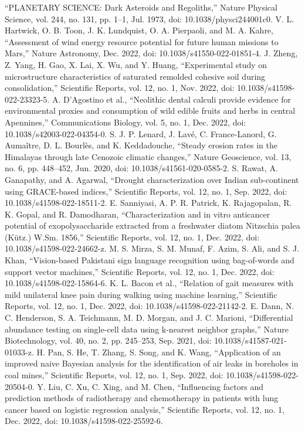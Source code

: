 \documentclass[conference]{IEEEtran}
\begin{document}
\begin{thebibliography}{00}
 “PLANETARY SCIENCE: Dark Asteroids and Regoliths,” Nature Physical Science, vol. 244, no. 131, pp. 1–1, Jul. 1973, doi: 10.1038/physci244001c0.
 V. L. Hartwick, O. B. Toon, J. K. Lundquist, O. A. Pierpaoli, and M. A. Kahre, “Assessment of wind energy resource potential for future human missions to Mars,” Nature Astronomy, Dec. 2022, doi: 10.1038/s41550-022-01851-4.
 J. Zheng, Z. Yang, H. Gao, X. Lai, X. Wu, and Y. Huang, “Experimental study on microstructure characteristics of saturated remolded cohesive soil during consolidation,” Scientific Reports, vol. 12, no. 1, Nov. 2022, doi: 10.1038/s41598-022-23323-5.
 A. D’Agostino et al., “Neolithic dental calculi provide evidence for environmental proxies and consumption of wild edible fruits and herbs in central Apennines,” Communications Biology, vol. 5, no. 1, Dec. 2022, doi: 10.1038/s42003-022-04354-0.
 S. J. P. Lenard, J. Lavé, C. France-Lanord, G. Aumaître, D. L. Bourlès, and K. Keddadouche, “Steady erosion rates in the Himalayas through late Cenozoic climatic changes,” Nature Geoscience, vol. 13, no. 6, pp. 448–452, Jun. 2020, doi: 10.1038/s41561-020-0585-2.
 S. Rawat, A. Ganapathy, and A. Agarwal, “Drought characterization over Indian sub-continent using GRACE-based indices,” Scientific Reports, vol. 12, no. 1, Sep. 2022, doi: 10.1038/s41598-022-18511-2.
 E. Sanniyasi, A. P. R. Patrick, K. Rajagopalan, R. K. Gopal, and R. Damodharan, “Characterization and in vitro anticancer potential of exopolysaccharide extracted from a freshwater diatom Nitzschia palea (Kütz.) W.Sm. 1856,” Scientific Reports, vol. 12, no. 1, Dec. 2022, doi: 10.1038/s41598-022-24662-z.
 M. S. Mirza, S. M. Munaf, F. Azim, S. Ali, and S. J. Khan, “Vision-based Pakistani sign language recognition using bag-of-words and support vector machines,” Scientific Reports, vol. 12, no. 1, Dec. 2022, doi: 10.1038/s41598-022-15864-6.
 K. L. Bacon et al., “Relation of gait measures with mild unilateral knee pain during walking using machine learning,” Scientific Reports, vol. 12, no. 1, Dec. 2022, doi: 10.1038/s41598-022-21142-2.
 E. Dann, N. C. Henderson, S. A. Teichmann, M. D. Morgan, and J. C. Marioni, “Differential abundance testing on single-cell data using k-nearest neighbor graphs,” Nature Biotechnology, vol. 40, no. 2, pp. 245–253, Sep. 2021, doi: 10.1038/s41587-021-01033-z.
 H. Pan, S. He, T. Zhang, S. Song, and K. Wang, “Application of an improved naive Bayesian analysis for the identification of air leaks in boreholes in coal mines,” Scientific Reports, vol. 12, no. 1, Sep. 2022, doi: 10.1038/s41598-022-20504-0.
 Y. Liu, C. Xu, C. Xing, and M. Chen, “Influencing factors and prediction methods of radiotherapy and chemotherapy in patients with lung cancer based on logistic regression analysis,” Scientific Reports, vol. 12, no. 1, Dec. 2022, doi: 10.1038/s41598-022-25592-6.
\end{thebibliography}
\end{document}
